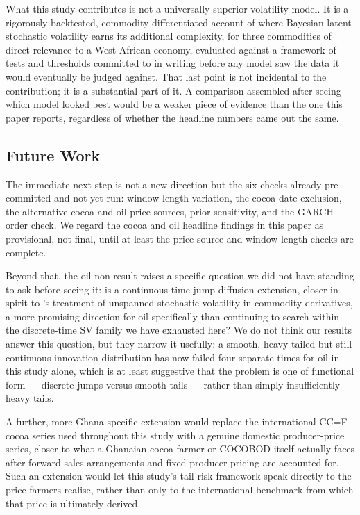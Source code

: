 \documentclass[preprint,12pt,authoryear]{elsarticle}
\begin{document}
What this study contributes is not a universally superior volatility model. It is a rigorously backtested, commodity-differentiated account of where Bayesian latent stochastic volatility earns its additional complexity, for three commodities of direct relevance to a West African economy, evaluated against a framework of tests and thresholds committed to in writing before any model saw the data it would eventually be judged against. That last point is not incidental to the contribution; it is a substantial part of it. A comparison assembled after seeing which model looked best would be a weaker piece of evidence than the one this paper reports, regardless of whether the headline numbers came out the same.

\subsection{Future Work}

The immediate next step is not a new direction but the six checks already pre-committed and not yet run: window-length variation, the cocoa date exclusion, the alternative cocoa and oil price sources, prior sensitivity, and the GARCH order check. We regard the cocoa and oil headline findings in this paper as provisional, not final, until at least the price-source and window-length checks are complete.

Beyond that, the oil non-result raises a specific question we did not have standing to ask before seeing it: is a continuous-time jump-diffusion extension, closer in spirit to \citet{trolleschwartz2009}'s treatment of unspanned stochastic volatility in commodity derivatives, a more promising direction for oil specifically than continuing to search within the discrete-time SV family we have exhausted here? We do not think our results answer this question, but they narrow it usefully: a smooth, heavy-tailed but still continuous innovation distribution has now failed four separate times for oil in this study alone, which is at least suggestive that the problem is one of functional form --- discrete jumps versus smooth tails --- rather than simply insufficiently heavy tails.

A further, more Ghana-specific extension would replace the international CC=F cocoa series used throughout this study with a genuine domestic producer-price series, closer to what a Ghanaian cocoa farmer or COCOBOD itself actually faces after forward-sales arrangements and fixed producer pricing are accounted for. Such an extension would let this study's tail-risk framework speak directly to the price farmers realise, rather than only to the international benchmark from which that price is ultimately derived.
\end{document}
